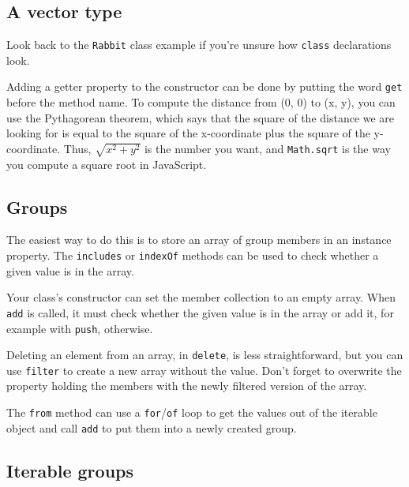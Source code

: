 \subsection{A vector type}

Look back to the \lstinline`Rabbit` class example if you're unsure how \lstinline`class` declarations look.

Adding a getter property to the constructor can be done by putting the word \lstinline`get` before the method name. To compute the distance from (0, 0) to (x, y), you can use the Pythagorean theorem, which says that the square of the distance we are looking for is equal to the square of the x-coordinate plus the square of the y-coordinate. Thus, $\sqrt{x^2 + y^2}$ is the number you want, and \lstinline`Math.sqrt` is the way you compute a square root in JavaScript.

\subsection{Groups}

The easiest way to do this is to store an array of group members in an instance property. The \lstinline`includes` or \lstinline`indexOf` methods can be used to check whether a given value is in the array.

Your class's constructor can set the member collection to an empty array. When \lstinline`add` is called, it must check whether the given value is in the array or add it, for example with \lstinline`push`, otherwise.

Deleting an element from an array, in \lstinline`delete`, is less straightforward, but you can use \lstinline`filter` to create a new array without the value. Don't forget to overwrite the property holding the members with the newly filtered version of the array.

The \lstinline`from` method can use a \lstinline`for`/\lstinline`of` loop to get the values out of the iterable object and call \lstinline`add` to put them into a newly created group.

\subsection{Iterable groups}

